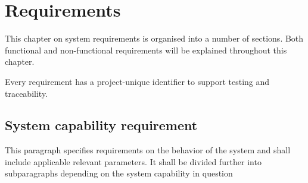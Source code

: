 \label{chp_requirements}
\chapter{Requirements}
This chapter on system requirements is organised into a number of sections. Both functional and non-functional requirements will be explained throughout this chapter.

Every requirement has a project-unique identifier to support testing and traceability.


\section{System capability requirement}
This paragraph specifies requirements on the behavior of the system and shall include applicable relevant parameters. It shall be divided further into subparagraphs depending on the system capability in question



